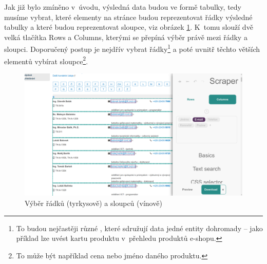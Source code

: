 \documentclass[thesis=B,czech]{FITthesis}[2012/06/26]
\begin{document}
Jak již bylo zmíněno v~úvodu, výsledná data budou ve formě tabulky, tedy musíme vybrat, které elementy na stránce budou reprezentovat řádky výsledné tabulky a které budou reprezentovat sloupce, viz obrázek \ref{fig:scraper_rows_cols}. K~tomu slouží dvě velká tlačítka \textsf{Rows} a \textsf{Columns}, kterými se přepíná výběr právě mezi řádky a sloupci. Doporučený postup je nejdřív vybrat řádky\footnote{To budou nejčastěji různé , které sdružují data jedné entity dohromady -- jako příklad lze uvést kartu produktu v~přehledu produktů e-shopu.} a poté uvnitř těchto větších elementů vybírat sloupce\footnote{To může být například cena nebo jméno daného produktu.}.
\begin{figure}
	\includegraphics[width=\linewidth]{images/Scraper_rows_cols.png}
	\caption[Výběr řádků a sloupců]{Výběr řádků (tyrkysově) a sloupců (vínově)}
	\label{fig:scraper_rows_cols}
\end{figure}
\end{document}
